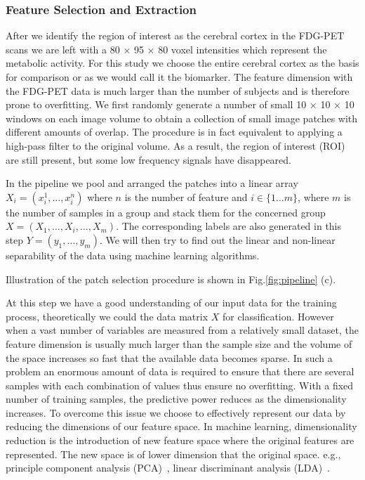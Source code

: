 \documentclass[authoryear,preprint,revi	ew,12pt]{elsarticle}
\begin{document}
\subsubsection{Feature Selection and Extraction}
\label{subsec:pipline}
After we identify the region of interest as the cerebral cortex in the FDG-PET scans we are left with a 80 $ \times $ 95 $ \times $ 80 voxel intensities which represent the metabolic activity. For this study we choose the entire cerebral cortex as the basis for comparison or as we would call it the biomarker. The feature dimension with the FDG-PET data is much larger than the number of subjects and is therefore prone to overfitting. We first randomly generate a number of small 10 $ \times $ 10 $ \times $ 10 windows on each image volume to obtain a collection of small image patches with different amounts of overlap. The procedure is in fact equivalent to applying a high-pass filter to the original volume. As a result, the region of interest (ROI) are still present, but some low frequency signals have disappeared. 

In the pipeline we pool and arranged the patches into a linear array $ X_i = (x^1_i,\dots,x^n_i) $ where $ n $ is the number of feature and $ i \in \{1 \dots m\} $, where $ m $ is the number of samples in a group and stack them for the concerned group $ X = (X_1,\dots,X_i,\dots,X_m) $. The corresponding labels are also generated in this step $ Y = (y_1,\dots,y_m) $. We will then try to find out the linear and non-linear separability of the data using machine learning algorithms.

Illustration of the patch selection procedure is shown in Fig.\ref{fig:pipeline} (c).

At this step we have a good understanding of our input data for the training process, theoretically we could the data matrix $ X $ for classification. However when a vast number of variables are measured from a relatively small dataset, the feature dimension is usually much larger than the sample size and the volume of the space increases so fast that the available data becomes sparse. In such a problem an enormous amount of data is required to ensure that there are several samples with each combination of values thus ensure no overfitting. With a fixed number of training samples, the predictive power reduces as the dimensionality increases. To overcome this issue we choose to effectively represent our data by reducing the dimensions of our feature space. In machine learning, dimensionality reduction is the introduction of new feature space where the original features are represented. The new space is of lower dimension that the original space. e.g., principle component analysis (PCA)~\citep{jolliffe2002principal}, linear discriminant analysis (LDA)~\citep{mika1999fisher}.
\end{document}
